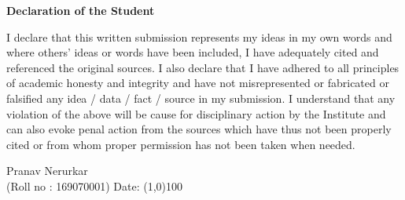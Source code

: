\documentclass[oneside,11pt]{Classes/CUEDthesisPSnPDF}
\theoremstyle{definition}
\begin{document}
\vspace*{3\baselineskip}
\begin{center}\begin{Large}\textbf{Declaration of the Student}\end{Large}\end{center}
\vspace*{2\baselineskip}
\begin{large}
I declare that this written submission represents my ideas in my own words and where others' ideas or
words have been included, I have adequately cited and referenced the original sources.
\vspace*{1\baselineskip}
I also declare that I have adhered to all principles of academic honesty and integrity and have not
misrepresented or fabricated or falsified any idea / data / fact / source in my submission. 
\vspace*{1\baselineskip}
I understand that any violation of the above will be cause for disciplinary action by the Institute and can
also evoke penal action from the sources which have thus not been properly cited or from whom proper
permission has not been taken when needed. 
\end{large}
\vspace*{13\baselineskip}

 
\vspace*{0\baselineskip}
Pranav Nerurkar \\
\hspace{0.5in}(Roll no :   169070001)   \hspace{2.5in} Date: \line(1,0){100}
















%

%
%
%
%


\tableofcontents
\listoffigures
\listoftables
%
\mainmatter %

%



 
\end{document}
